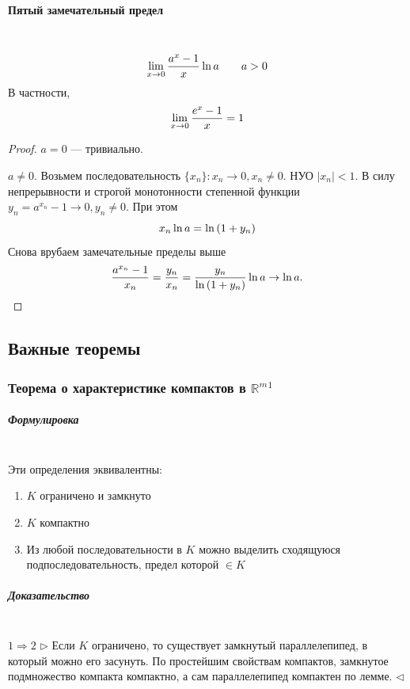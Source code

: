 \documentclass{article}
\let\vanillaparagraph\paragraph
\let\vanillasubparagraph\subparagraph
\renewcommand{\paragraph}[1]{\vanillaparagraph{#1}\mbox{}\\}
\renewcommand{\subparagraph}[1]{\vanillasubparagraph{#1}\mbox{}\\}
\begin{document}
\paragraph{Пятый замечательный предел}
\begin{equation}
\lim_{x\to 0} \frac{a^x - 1} {x} \ln{a} \qquad a > 0\notag
\end{equation}
В частности, 
\begin{equation}
\lim_{x\to 0} \frac{e^x - 1} {x} = 1\notag
\end{equation}
\begin{proof}
\item $a = 0$ --- тривиально.
\item $a \neq 0$. Возьмем последовательность $\{x_n\}: x_n \to 0, x_n \neq 0$. НУО $|x_n| < 1$. В силу непрерывности и строгой монотонности степенной функции  $y_n = a^{x_n} - 1\to 0, y_n \neq 0$. При этом
\begin{equation}
x_n\ln{a} = \ln{(1 + y_n)}\notag
\end{equation}
Снова врубаем замечательные пределы выше
\begin{equation}
\frac{a^{x_n} - 1} {x_n} = \frac{y_n} {x_n} = \frac{y_n} {\ln{(1 + y_n)}} \ln{a} \to \ln{a}. \notag
\end{equation}
\end{proof}

\newpage
\subsection{Важные теоремы}
\subsubsection{Теорема о характеристике компактов в \texorpdfstring{$\mathbb{R}^m$}{m-мерном R}\texorpdfstring{$^1$}{}}
\label{КомпХарR}
\subparagraph{Формулировка}
Эти определения эквивалентны:
\begin{enumerate}
    \item $K$ ограничено и замкнуто
    \item $K$ компактно
    \item Из любой последовательности в $K$ можно выделить сходящуюся подпоследовательность, предел которой $\in K$
\end{enumerate}

\subparagraph{Доказательство}
$1 \Rightarrow 2$
$\rhd$
Если $K$ ограничено, то существует замкнутый параллелепипед, в который можно его засунуть. По простейшим свойствам компактов, замкнутое подмножество компакта компактно, а сам параллелепипед компактен по лемме.
$\lhd$
\end{document}
